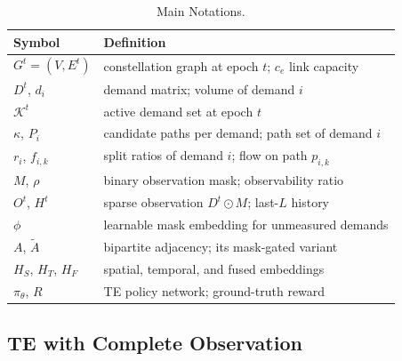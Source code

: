 \begin{table}[t]
    \caption{Main Notations.}
    \label{tab:notation}
    \centering
    \footnotesize
    \begin{tabular}{@{}ll@{}}
        \toprule
        Symbol & Definition \\
        \midrule
        $G^t=(V,E^t)$ & constellation graph at epoch $t$; $c_e$ link capacity \\
        $D^t$, $d_i$ & demand matrix; volume of demand $i$ \\
        $\mathcal{K}^t$ & active demand set at epoch $t$ \\
        $\kappa$, $P_i$ & candidate paths per demand; path set of demand $i$ \\
        $r_i$, $f_{i,k}$ & split ratios of demand $i$; flow on path $p_{i,k}$ \\
        $M$, $\rho$ & binary observation mask; observability ratio \\
        $O^t$, $H^t$ & sparse observation $D^t{\odot}M$; last-$L$ history \\
        $\phi$ & learnable mask embedding for unmeasured demands \\
        $A$, $\tilde{A}$ & bipartite adjacency; its mask-gated variant \\
        $H_S$, $H_T$, $H_F$ & spatial, temporal, and fused embeddings \\
        $\pi_\theta$, $R$ & TE policy network; ground-truth reward \\
        \bottomrule
    \end{tabular}
\end{table}

\subsection{TE with Complete Observation}
\label{sec:complete-te}

